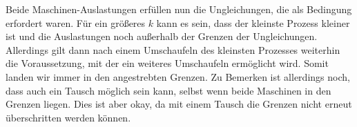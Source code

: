 \documentclass[12pt,a4paper]{article}
\begin{document}
\begin{enumerate}[a)]
		Beide Maschinen-Auslastungen erfüllen nun die Ungleichungen, die als Bedingung erfordert waren. Für ein größeres $k$ kann es sein, dass der kleinste Prozess kleiner ist und die Auslastungen noch außerhalb der Grenzen der Ungleichungen. Allerdings gilt dann nach einem Umschaufeln des kleinsten Prozesses weiterhin die Voraussetzung, mit der ein weiteres Umschaufeln ermöglicht wird. Somit landen wir immer in den angestrebten Grenzen. Zu Bemerken ist allerdings noch, dass auch ein Tausch möglich sein kann, selbst wenn beide Maschinen in den Grenzen liegen. Dies ist aber okay, da mit einem Tausch die Grenzen nicht erneut überschritten werden können.
		
\end{enumerate}
\end{document}
